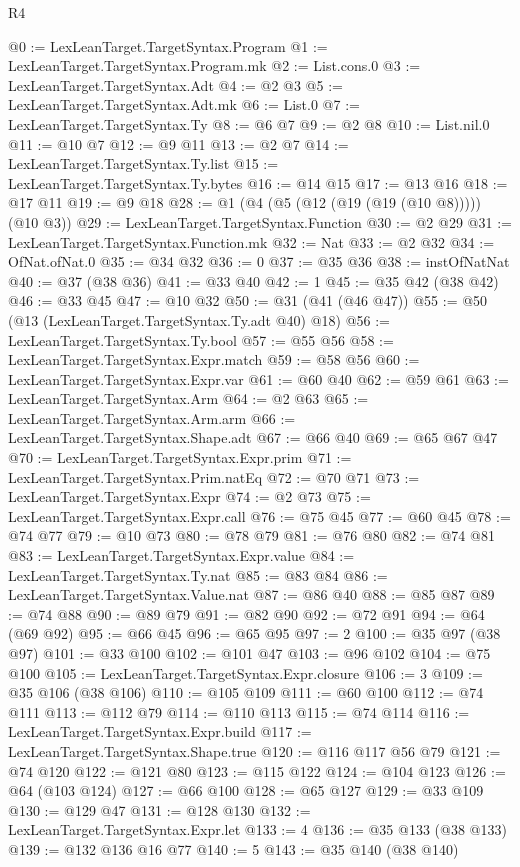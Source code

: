\begin{lexlean}{R4}
\begin{coremodule}
@0 := LexLeanTarget.TargetSyntax.Program
@1 := LexLeanTarget.TargetSyntax.Program.mk
@2 := List.cons.{0}
@3 := LexLeanTarget.TargetSyntax.Adt
@4 := @2 @3
@5 := LexLeanTarget.TargetSyntax.Adt.mk
@6 := List.{0}
@7 := LexLeanTarget.TargetSyntax.Ty
@8 := @6 @7
@9 := @2 @8
@10 := List.nil.{0}
@11 := @10 @7
@12 := @9 @11
@13 := @2 @7
@14 := LexLeanTarget.TargetSyntax.Ty.list
@15 := LexLeanTarget.TargetSyntax.Ty.bytes
@16 := @14 @15
@17 := @13 @16
@18 := @17 @11
@19 := @9 @18
@28 := @1 (@4 (@5 (@12 (@19 (@19 (@10 @8))))) (@10 @3))
@29 := LexLeanTarget.TargetSyntax.Function
@30 := @2 @29
@31 := LexLeanTarget.TargetSyntax.Function.mk
@32 := Nat
@33 := @2 @32
@34 := OfNat.ofNat.{0}
@35 := @34 @32
@36 := 0
@37 := @35 @36
@38 := instOfNatNat
@40 := @37 (@38 @36)
@41 := @33 @40
@42 := 1
@45 := @35 @42 (@38 @42)
@46 := @33 @45
@47 := @10 @32
@50 := @31 (@41 (@46 @47))
@55 := @50 (@13 (LexLeanTarget.TargetSyntax.Ty.adt @40) @18)
@56 := LexLeanTarget.TargetSyntax.Ty.bool
@57 := @55 @56
@58 := LexLeanTarget.TargetSyntax.Expr.match
@59 := @58 @56
@60 := LexLeanTarget.TargetSyntax.Expr.var
@61 := @60 @40
@62 := @59 @61
@63 := LexLeanTarget.TargetSyntax.Arm
@64 := @2 @63
@65 := LexLeanTarget.TargetSyntax.Arm.arm
@66 := LexLeanTarget.TargetSyntax.Shape.adt
@67 := @66 @40
@69 := @65 @67 @47
@70 := LexLeanTarget.TargetSyntax.Expr.prim
@71 := LexLeanTarget.TargetSyntax.Prim.natEq
@72 := @70 @71
@73 := LexLeanTarget.TargetSyntax.Expr
@74 := @2 @73
@75 := LexLeanTarget.TargetSyntax.Expr.call
@76 := @75 @45
@77 := @60 @45
@78 := @74 @77
@79 := @10 @73
@80 := @78 @79
@81 := @76 @80
@82 := @74 @81
@83 := LexLeanTarget.TargetSyntax.Expr.value
@84 := LexLeanTarget.TargetSyntax.Ty.nat
@85 := @83 @84
@86 := LexLeanTarget.TargetSyntax.Value.nat
@87 := @86 @40
@88 := @85 @87
@89 := @74 @88
@90 := @89 @79
@91 := @82 @90
@92 := @72 @91
@94 := @64 (@69 @92)
@95 := @66 @45
@96 := @65 @95
@97 := 2
@100 := @35 @97 (@38 @97)
@101 := @33 @100
@102 := @101 @47
@103 := @96 @102
@104 := @75 @100
@105 := LexLeanTarget.TargetSyntax.Expr.closure
@106 := 3
@109 := @35 @106 (@38 @106)
@110 := @105 @109
@111 := @60 @100
@112 := @74 @111
@113 := @112 @79
@114 := @110 @113
@115 := @74 @114
@116 := LexLeanTarget.TargetSyntax.Expr.build
@117 := LexLeanTarget.TargetSyntax.Shape.true
@120 := @116 @117 @56 @79
@121 := @74 @120
@122 := @121 @80
@123 := @115 @122
@124 := @104 @123
@126 := @64 (@103 @124)
@127 := @66 @100
@128 := @65 @127
@129 := @33 @109
@130 := @129 @47
@131 := @128 @130
@132 := LexLeanTarget.TargetSyntax.Expr.let
@133 := 4
@136 := @35 @133 (@38 @133)
@139 := @132 @136 @16 @77
@140 := 5
@143 := @35 @140 (@38 @140)

\end{coremodule}
\end{lexlean}

